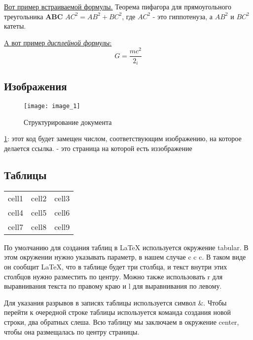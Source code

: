 \documentclass[12pt]{article}        %
\begin{document}
\underline{Вот пример встраиваемой формулы.} Теорема пифагора для прямоугольного треугольника \textbf{ABC} \begin{math}AC^2 = AB^2 + BC^2\end{math}, где $AC^2$ - это гиппотенуза, а $AB^2$ и $BC^2$ катеты.


\underline{A вот пример \textit{дисплейной формулы}:}
\begin{displaymath} G =  \frac{mc^2}{2_i}\end{displaymath}

\subsection{Изображения}
\begin{figure}[h]
    \centering
    \texttt{[image: image\_1]}
    \caption{Структурирование документа}
    \label{fig:image1}
\end{figure}

\ref{fig:image1}: этот код будет замещен числом, соответствующим изображению, на которое делается ссылка.
\pageref{fig:image1} - это страница на которой есть иззображение

\subsection*{Таблицы}

\begin{center}
\begin{tabular}{ c c c }
 cell1 & cell2 & cell3 \\ 
 cell4 & cell5 & cell6 \\  
 cell7 & cell8 & cell9    
\end{tabular}
\end{center}

По умолчанию для создания таблиц в LaTeX используется окружение tabular. В этом окружении нужно указывать параметр, в нашем случае {c c c}. В таком виде он сообщит LaTeX, что в таблице будет три столбца, и текст внутри этих столбцов нужно разместить по центру. Можно также использовать r для выравнивания текста по правому краю и l для выравнивания по левому.

Для указания разрывов в записях таблицы используется символ \&. Чтобы перейти к очередной строке таблицы используется команда создания новой строки, два обратных слеша. Всю таблицу мы заключаем в окружение center, чтобы она размещалась по центру страницы.
\end{document}
